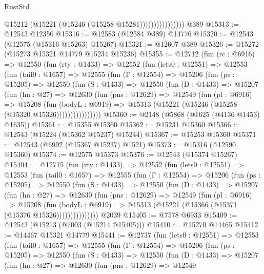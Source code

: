 \begin{lexlean}{RustStd}
\begin{coremodule}
                            @15212 (@15221 (@15246 (@15258 @15281))))))))))))))))
    @389
@15313 := @12543 @12350
@15316 := @12583 (@12584 @389) @14776
@15320 := @12543 (@12575 (@15316 @15263) @15267)
@15321 := @12607 @389
@15326 := @15272 (@15273 @15321 @14779 @15234 @15236)
@15355 := @12712
    (fun (rc : @6916) =>
    @12550
      (fun (rty : @1433) =>
      @12552
        (fun (lets0 : @12551) =>
        @12553
          (fun (tail0 : @1657) =>
          @12555
            (fun (Γ : @12554) =>
            @15206
              (fun (ps : @15205) =>
              @12550
                (fun (S : @1433) =>
                @12550
                  (fun (D : @1433) =>
                  @15207
                    (fun (hn : @27) =>
                    @12630
                      (fun (pns : @12629) =>
                      @12549
                        (fun (pl : @6916) =>
                        @15208
                          (fun (bodyL : @6919) =>
                          @15313 (@15221 (@15246 (@15258 (@15320 @15326))))))))))))))))
@15360 := @2148 (@5868 (@1625 (@4136 @1453) @1635))
@15361 := @15355 @15360
@15362 := @15231 @15360
@15366 := @12543 (@15224 (@15362 @15237) @15244)
@15367 := @15253 @15360
@15371 := @12543 (@6992 (@15367 @15237) @1521)
@15373 := @15316 (@12590 @15360)
@15374 := @12575 @15373
@15376 := @12543 (@15374 @15267)
@15404 := @12715
    (fun (rty : @1433) =>
    @12552
      (fun (lets0 : @12551) =>
      @12553
        (fun (tail0 : @1657) =>
        @12555
          (fun (Γ : @12554) =>
          @15206
            (fun (ps : @15205) =>
            @12550
              (fun (S : @1433) =>
              @12550
                (fun (D : @1433) =>
                @15207
                  (fun (hn : @27) =>
                  @12630
                    (fun (pns : @12629) =>
                    @12549
                      (fun (pl : @6916) =>
                      @15208
                        (fun (bodyL : @6919) =>
                        @15313 (@15221 (@15366 (@15371 (@15376 @15326)))))))))))))))
    @2039
@15405 := @7578 @6933
@15409 := @12543 (@15213 (@7003 (@15214 @15405)))
@15410 := @15270 @14465
@15412 := @14467 @15321 @14779
@15441 := @12737
    (fun (lets0 : @12551) =>
    @12553
      (fun (tail0 : @1657) =>
      @12555
        (fun (Γ : @12554) =>
        @15206
          (fun (ps : @15205) =>
          @12550
            (fun (S : @1433) =>
            @12550
              (fun (D : @1433) =>
              @15207
                (fun (hn : @27) =>
                @12630
                  (fun (pns : @12629) =>
                  @12549

\end{coremodule}
\end{lexlean}
